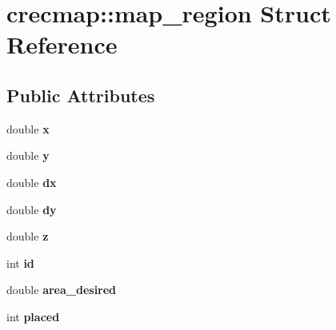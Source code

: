 \hypertarget{structcrecmap_1_1map__region}{\section{crecmap\+:\+:map\+\_\+region Struct Reference}
\label{structcrecmap_1_1map__region}
}
\subsection*{Public Attributes}
\begin{DoxyCompactItemize}
\item 
\hypertarget{structcrecmap_1_1map__region_af97de6d9252476764e052567b4db4245}{double {\bfseries x}}\label{structcrecmap_1_1map__region_af97de6d9252476764e052567b4db4245}

\item 
\hypertarget{structcrecmap_1_1map__region_ab1c494cbbd70260988a36ea97861fdaa}{double {\bfseries y}}\label{structcrecmap_1_1map__region_ab1c494cbbd70260988a36ea97861fdaa}

\item 
\hypertarget{structcrecmap_1_1map__region_a18f763b6bae24cc9eb05c52900b7b6db}{double {\bfseries dx}}\label{structcrecmap_1_1map__region_a18f763b6bae24cc9eb05c52900b7b6db}

\item 
\hypertarget{structcrecmap_1_1map__region_accd40f846b5f71a946faa5af3766c5ca}{double {\bfseries dy}}\label{structcrecmap_1_1map__region_accd40f846b5f71a946faa5af3766c5ca}

\item 
\hypertarget{structcrecmap_1_1map__region_a3c8ca629979ccd7b2a281a2e84b37b8d}{double {\bfseries z}}\label{structcrecmap_1_1map__region_a3c8ca629979ccd7b2a281a2e84b37b8d}

\item 
\hypertarget{structcrecmap_1_1map__region_a4695e166e93d4929524699e337183b0f}{int {\bfseries id}}\label{structcrecmap_1_1map__region_a4695e166e93d4929524699e337183b0f}

\item 
\hypertarget{structcrecmap_1_1map__region_a0871482039e61a3006b2646a33b028e4}{double {\bfseries area\+\_\+desired}}\label{structcrecmap_1_1map__region_a0871482039e61a3006b2646a33b028e4}

\item 
\hypertarget{structcrecmap_1_1map__region_afc41f4e791380ef057a5ca94d94be64d}{int {\bfseries placed}}\label{structcrecmap_1_1map__region_afc41f4e791380ef057a5ca94d94be64d}


\end{DoxyCompactItemize}
